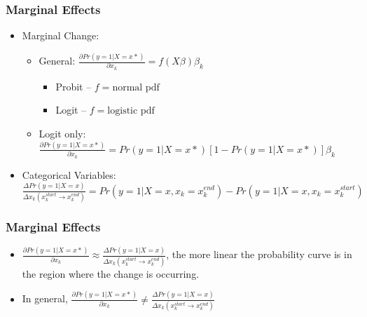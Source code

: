 \documentclass{beamer}
\begin{document}
\begin{frame}
	\frametitle{Marginal Effects}
	\begin{itemize}
		\item Marginal Change: 
		\begin{itemize}
			\item General: $\frac{\partial Pr\left(y=1|X=x*\right)}{\partial x_{k}}=f(X\beta)\beta_{k}$
			\begin{itemize}
				\item Probit -- $f=\mbox{normal pdf}$
				\item Logit -- $f=\mbox{logistic pdf}$
			\end{itemize}
			\item Logit only: $\frac{\partial Pr\left(y=1|X=x*\right)}{\partial x_{k}}=Pr\left(y=1|X=x*\right)\left[1-Pr\left(y=1|X=x*\right)\right]\beta_{k}$
		\end{itemize}
		\item Categorical Variables: $\frac{\Delta Pr\left(y=1|X=x\right)}{\Delta x_{k}\left(x^{start}_{k}\rightarrow x^{end}_{k}\right)}=Pr\left(y=1|X=x, x_{k}=x^{end}_{k}\right)-Pr\left(y=1|X=x, x_{k}=x^{start}_{k}\right)$
	\end{itemize}
\end{frame}

\begin{frame}
	\frametitle{Marginal Effects}
	\begin{itemize}
		\item $\frac{\partial Pr\left(y=1|X=x*\right)}{\partial x_{k}}\approx\frac{\Delta Pr\left(y=1|X=x\right)}{\Delta x_{k}\left(x^{start}_{k}\rightarrow x^{end}_{k}\right)}$, the more linear the probability curve is in the region where the change is occurring.
		\item In general, $\frac{\partial Pr\left(y=1|X=x*\right)}{\partial x_{k}}\neq\frac{\Delta Pr\left(y=1|X=x\right)}{\Delta x_{k}\left(x^{start}_{k}\rightarrow x^{end}_{k}\right)}$
	\end{itemize}
\end{frame}
\end{document}
